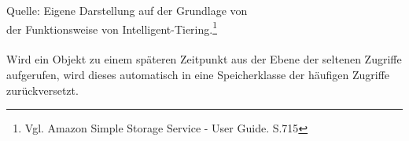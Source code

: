 Quelle: Eigene Darstellung auf der Grundlage von \\
der Funktionsweise von Intelligent-Tiering.\footnote{Vgl. Amazon Simple Storage Service - User Guide. S.715\cite{AMZ18}}
\\\\
Wird ein Objekt zu einem späteren Zeitpunkt aus der Ebene der seltenen Zugriffe aufgerufen, wird dieses automatisch in eine Speicherklasse der häufigen Zugriffe zurückversetzt.
